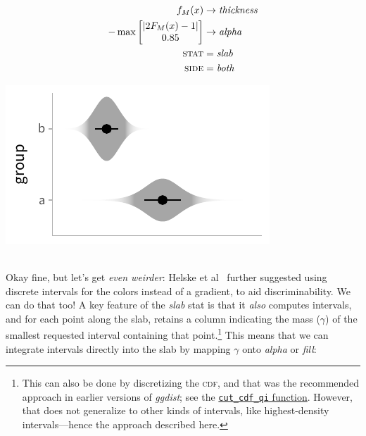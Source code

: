 \documentclass[journal]{vgtc}                     %
\newcommand{\equationfigure}[2]{%
\noindent
\begin{minipage}{.5\columnwidth}
\setlength{\abovedisplayskip}{0pt}
\setlength{\belowdisplayskip}{0pt}
#1\end{minipage}%
\begin{minipage}{.4\columnwidth}\centering #2 \end{minipage}%
\vspace{.5\belowdisplayskip}\\
}
\begin{document}
\equationfigure{
\begin{align*}
f_M(x) &\rightarrow \textit{thickness}\\
-\max \left[ \begin{matrix} \lvert 2 F_M(x) - 1 \rvert \\ 0.85 \end{matrix} \right] &\rightarrow \textit{alpha}\\
\textsc{stat} &= \mathit{slab}\\
\textsc{side} &= \mathit{both}
\end{align*}
}{\includegraphics[width=1.2\columnwidth]{figs/3-slab_violin_gradient.pdf}}
Okay fine, but let's get \textit{even weirder}: Helske et al~\cite{helske2021can} further suggested using discrete intervals for the colors instead of a gradient, to aid discriminability. We can do that too! A key feature of the \textit{slab} stat is that it \textit{also} computes intervals, and for each point along the slab, retains a column indicating the mass ($\gamma$) of the smallest requested interval containing that point.\footnote{This can also be done by discretizing the \textsc{cdf}, and that was the recommended approach in earlier versions of \textit{ggdist}; see the \href{https://mjskay.github.io/ggdist/reference/cut_cdf_qi.html}{\texttt{cut\_cdf\_qi} function}. However, that does not generalize to other kinds of intervals, like highest-density intervals---hence the approach described here.}  This means that we can integrate intervals directly into the slab by mapping $\gamma$ onto \textit{alpha} or \textit{fill}:
\end{document}
